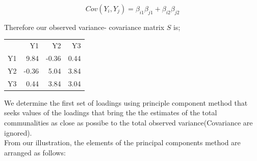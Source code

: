 \documentclass[12]{article}
\begin{document}
$$Cov(Y_i, Y_j)= \beta_{i1}\beta_{j1} + \beta_{i2}\beta_{j2}$$

\noindent Therefore our observed variance- covariance matrix $S$ is;

\begin{table}[ht]
	\centering

	\begin{tabular}{rrrr}
	
		& Y1 & Y2 & Y3 \\ 

		Y1 & 9.84 & -0.36 & 0.44 \\ 
		Y2 & -0.36 & 5.04 & 3.84 \\ 
		Y3 & 0.44 & 3.84 & 3.04 \\ 
	\end{tabular}
\end{table}
\noindent We determine the first set of loadings using principle component method that seeks values of the loadings that bring the the estimates of the total communalities as close as possibe to the total observed variance(Covariance are ignored).\\
From our illustration, the elements of the principal components method are arranged as follows:
\end{document}
